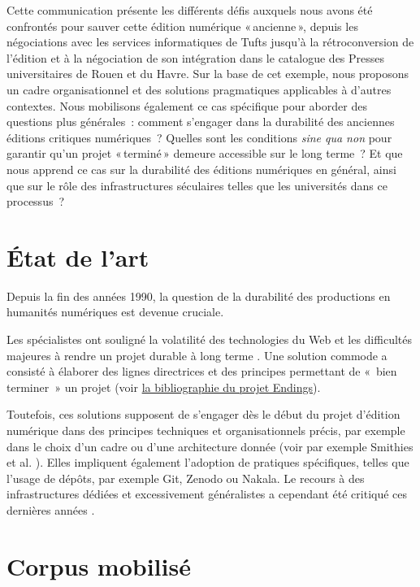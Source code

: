 \documentclass[final,fra]{anthology-ch} %
\begin{document}
Cette communication présente les différents défis auxquels nous avons
été confrontés pour sauver cette édition numérique «\,ancienne\,»,
depuis les négociations avec les services informatiques de Tufts jusqu'à
la rétroconversion de l'édition et à la négociation de son intégration
dans le catalogue des Presses universitaires de Rouen et du Havre. Sur
la base de cet exemple, nous proposons un cadre organisationnel et des
solutions pragmatiques applicables à d'autres contextes. Nous mobilisons
également ce cas spécifique pour aborder des questions plus générales~:
comment s'engager dans la durabilité des anciennes éditions critiques
numériques~? Quelles sont les conditions \emph{sine qua non} pour
garantir qu'un projet «\,terminé\,» demeure accessible sur le long terme~? Et que nous apprend ce cas sur la durabilité des éditions numériques
en général, ainsi que sur le rôle des infrastructures séculaires telles
que les universités dans ce processus~?

\section{État de l'art}\label{uxe9tat-de-lart}

Depuis la fin des années 1990, la question de la durabilité des
productions en humanités numériques est devenue cruciale.

Les spécialistes ont souligné la volatilité des technologies
du Web et les difficultés majeures à rendre un projet durable à long
terme \autocite{cummings_academics_2023}. Une solution commode a
consisté à élaborer des lignes directrices et des principes permettant
de «~bien terminer~» un projet (voir
\href{https://endings.uvic.ca/outputs.html}{la bibliographie du projet
Endings}).

Toutefois, ces solutions supposent de s'engager dès le début du projet
d'édition numérique dans des principes techniques et organisationnels
précis, par exemple dans le choix d'un cadre ou d'une architecture
donnée (voir par exemple Smithies et al. \cite{smithies_managing_2019}). Elles
impliquent également l'adoption de pratiques spécifiques, telles que
l'usage de dépôts, par exemple Git, Zenodo ou Nakala. Le recours à des
infrastructures dédiées et excessivement généralistes a cependant été
critiqué ces dernières années
\cite{van_zundert_if_2012,viglianti_4_2025}.

\section{Corpus mobilisé}\label{corpus-mobilisuxe9}
\end{document}
